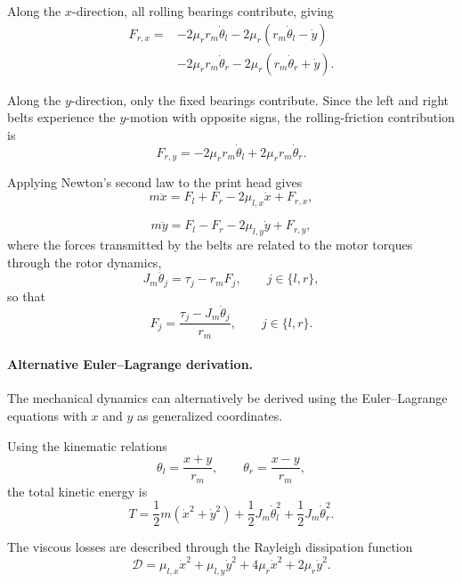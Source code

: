 \documentclass[11pt,a4paper]{article}
\begin{document}
Along the $x$-direction, all rolling bearings contribute, giving
\begin{equation}
\begin{aligned}
F_{r,x} ={}&
-2\mu_r r_m\dot{\theta}_l
-2\mu_r\left(r_m\dot{\theta}_l-\dot{y}\right)\\
&-2\mu_r r_m\dot{\theta}_r
-2\mu_r\left(r_m\dot{\theta}_r+\dot{y}\right).
\end{aligned}
\end{equation}

Along the $y$-direction, only the fixed bearings contribute. Since the left and right belts experience the $y$-motion with opposite signs, the rolling-friction contribution is
\begin{equation}
F_{r,y}
=
-2\mu_r r_m\dot{\theta}_l
+2\mu_r r_m\dot{\theta}_r.
\end{equation}

Applying Newton's second law to the print head gives
\begin{equation}
m\ddot{x}
=
F_l+F_r
-2\mu_{l,x}\dot{x}
+F_{r,x},
\end{equation}

\begin{equation}
m\ddot{y}
=
F_l-F_r
-2\mu_{l,y}\dot{y}
+F_{r,y},
\end{equation}
where the forces transmitted by the belts are related to the motor torques through the rotor dynamics,
\[
J_m\ddot{\theta}_j=\tau_j-r_mF_j,
\qquad j\in\{l,r\},
\]
so that
\[
F_j=
\frac{\tau_j-J_m\ddot{\theta}_j}{r_m},
\qquad j\in\{l,r\}.
\]

\paragraph{Alternative Euler--Lagrange derivation.}
The mechanical dynamics can alternatively be derived using the
Euler--Lagrange equations with $x$ and $y$ as generalized coordinates.

Using the kinematic relations
\[
\theta_l=\frac{x+y}{r_m},
\qquad
\theta_r=\frac{x-y}{r_m},
\]
the total kinetic energy is
\begin{equation}
T=
\frac{1}{2}m\left(\dot{x}^2+\dot{y}^2\right)
+
\frac{1}{2}J_m\dot{\theta}_l^2
+
\frac{1}{2}J_m\dot{\theta}_r^2.
\end{equation}

The viscous losses are described through the Rayleigh dissipation function
\begin{equation}
\mathcal{D}
=
\mu_{l,x}\dot{x}^2
+
\mu_{l,y}\dot{y}^2
+
4\mu_r\dot{x}^2
+
2\mu_r\dot{y}^2.
\end{equation}
\end{document}
